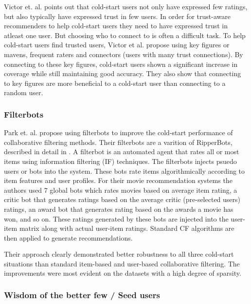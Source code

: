 Victor et. al. \cite{Victor2008} points out that cold-start users not only have expressed few ratings, but also typically have expressed trust in few users. In order for trust-aware recommenders to help cold-start users they need to have expressed trust in atleast one user. But choosing who to connect to is often a difficult task. To help cold-start users find trusted users, Victor et al. propose using key figures or mavens, frequent raters and connectors (users with many trust connections). By connecting to these key figures, cold-start users shown a significant increase in coverage while still maintaining good accuracy. They also show that connecting to key figures are more beneficial to a cold-start user than connecting to a random user.

\subsubsection{Filterbots}


Park et. al. \cite{Park2006} propose using filterbots to improve the cold-start
performance of collaborative filtering methods. Their filterbots are a varition of RipperBots, described in detail in \cite{Good1999}. A filterbot is an automated agent that rates all or most items using information filtering (IF) techniques. The filterbots injects psuedo
users or bots into the system. These bots rate items algorithmically according to item features and user profiles. For their movie recommendation systems the authors used 7 global bots which rates movies based on average item rating, a critic bot that generates ratings based on the average critic (pre-selected users) ratings, an award bot that generates rating based on the awards a movie has won, and so on. These ratings generated by these bots are injected into the user-item matrix along with actual user-item ratings. Standard CF algorithms are then applied to generate
recommendations.

Their approach clearly demonstrated better robustness to all three cold-start situations than standard item-based
and user-based collaborative filtering. The improvements were most evident on
the datasets with a high degree of sparsity.


\subsubsection{Wisdom of the better few / Seed users}

